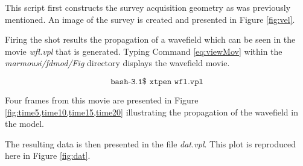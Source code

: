This script first constructs the survey acquisition geometry as was previously mentioned.  An image of the survey is created and presented
in Figure \ref{fig:vel}.


Firing the shot results the propagation of a wavefield which can be seen in the movie \emph{wfl.vpl} that is generated.  Typing
Command \ref{eq:viewMov} within the \emph{marmousi/fdmod/Fig} directory displays the wavefield movie.

\begin{equation}\label{eq:viewMov} \texttt{bash-3.1\$\ xtpen\ wfl.vpl} \end{equation}

Four frames from this movie are presented in Figure \ref{fig:time5,time10,time15,time20}  illustrating the
propagation of the wavefield in the model.


The resulting data is then presented in the file \emph{dat.vpl}.  This plot is reproduced here in Figure \ref{fig:dat}. 


